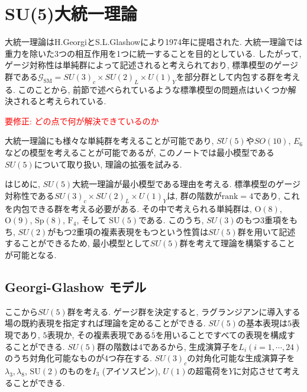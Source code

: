 \documentclass[uplatex,dvipdfmx,a4paper,titlepage]{jsbook}
\theoremstyle{plain}
\theoremstyle{definition}
\begin{document}
{\chapter{SU(5)大統一理論}
% 
%
大統一理論はH.GeorgiとS.L.Glashowにより1974年に提唱された\cite{PhysRevLett.32.438}.
大統一理論では重力を除いた3つの相互作用を1つに統一することを目的としている.
したがって, ゲージ対称性は単純群によって記述されると考えられており, 標準模型のゲージ群である$\mathcal{G}_\text{SM}= SU(3)_c\times SU(2)_L\times U(1)_Y$を部分群として内包する群を考える.
このことから, 前節で述べられているような標準模型の問題点はいくつか解決されると考えられている.

\textcolor{red}{要修正: どの点で何が解決できているのか}

大統一理論にも様々な単純群を考えることが可能であり, $SU(5)$や$SO(10)$, $E_6$などの模型を考えることが可能であるが, このノートでは最小模型である$SU(5)$について取り扱い, 理論の拡張を試みる.

はじめに, $SU(5)$大統一理論が最小模型である理由を考える.
標準模型のゲージ対称性である$SU(3)_c\times SU(2)_L\times U(1)_Y$は, 群の階数が$\text{rank}=4$であり, これを内包できる群を考える必要がある.
その中で考えられる単純群は, $\text{O}(8)$, $\mathrm{O}(9)$, $\mathrm{Sp}(8)$, $\mathrm{F}_4$, そして $\mathrm{SU}(5)$である.
このうち, $SU(3)$のもつ3重項をもち, $SU(2)$がもつ2重項の複素表現をもつという性質は$SU(5)$群を用いて記述することができるため, 最小模型として$SU(5)$群を考えて理論を構築することが可能となる.

\section{Georgi-Glashow モデル}
ここから$SU(5)$群を考える.
ゲージ群を決定すると, ラグランジアンに導入する場の既約表現を指定すれば理論を定めることができる.
$SU(5)$の基本表現は$5$表現であり, $5$表現か, その複素表現である$\overline{5}$を用いることですべての表現を構成することができる.
$SU(5)$群の階数は4であるから, 生成演算子を$L_i$$(i=1,\cdots,24)$ のうち対角化可能なものが4つ存在する.
$SU(3)_c$の対角化可能な生成演算子を$\lambda_3,\lambda_8$, $\mathrm{SU}(2)$のものを$I_3$ (アイソスピン), $U(1)$の超電荷を$Y$に対応させて考えることができる.

}
\end{document}
